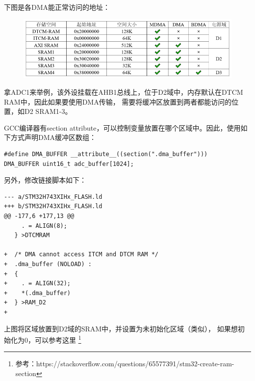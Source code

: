 下图是各DMA能正常访问的地址：

\begin{figure}[H]
\center
  \includegraphics[width=\textwidth]{img/dma-section.png}
\end{figure}

拿ADC1来举例，该外设挂载在AHB1总线上，位于D2域中，内存默认在DTCM RAM中，因此如果要使用DMA传输，
需要将缓冲区放置到两者都能访问的位置，如D2 SRAM1-3。

GCC编译器有section attribute，可以控制变量放置在哪个区域中。因此，使用如下方式声明DMA缓冲区数组：

\begin{verbatim}
#define DMA_BUFFER __attribute__((section(".dma_buffer")))
DMA_BUFFER uint16_t adc_buffer[1024];
\end{verbatim}

另外，修改链接脚本如下：
\begin{verbatim}
--- a/STM32H743XIHx_FLASH.ld
+++ b/STM32H743XIHx_FLASH.ld
@@ -177,6 +177,13 @@
     . = ALIGN(8);
   } >DTCMRAM
 
+  /* DMA cannot access ITCM and DTCM RAM */
+  .dma_buffer (NOLOAD) :
+  {
+    . = ALIGN(32);
+    *(.dma_buffer)
+  } >RAM_D2
+
\end{verbatim}

上图将区域放置到D2域的SRAM中，并设置为未初始化区域（类似），
如果想初始化为0，可以参考这里
\footnote{参考：https://stackoverflow.com/questions/65577391/stm32-create-ram-section}
